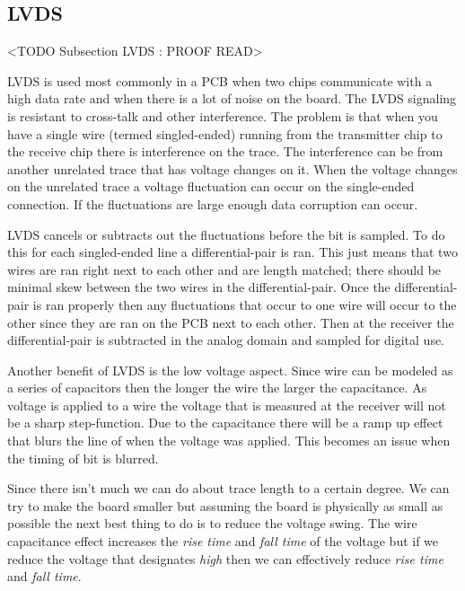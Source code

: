 	
\subsection{LVDS}  
	<TODO Subsection LVDS : PROOF READ>	
	
\ac{LVDS} is used most commonly in a \ac{PCB} when two chips communicate with a high data rate and when there is a lot of noise on the board. The \ac{LVDS} signaling is resistant to cross-talk and other interference. The problem is that when you have a single wire (termed singled-ended) running from the transmitter chip to the receive chip there is interference on the trace. The interference can be from another unrelated trace that has voltage changes on it. When the voltage changes on the unrelated trace a voltage fluctuation can occur on the single-ended connection. If the fluctuations are large enough data corruption can occur.

\ac{LVDS} cancels or subtracts out the fluctuations before the bit is sampled. To do this for each singled-ended line a differential-pair is ran. This just means that two wires are ran right next to each other and are length matched; there should be minimal skew between the two wires in the differential-pair. Once the differential-pair is ran properly then any fluctuations that occur to one wire will occur to the other since they are ran on the \ac{PCB} next to each other. Then at the receiver the differential-pair is subtracted in the analog domain and sampled for digital use.

Another benefit of \ac{LVDS} is the low voltage aspect. Since wire can be modeled as a series of capacitors then the longer the wire the larger the capacitance. As voltage is applied to a wire the voltage that is measured at the receiver will not be a sharp step-function. Due to the capacitance there will be a ramp up effect that blurs the line of when the voltage was applied. This becomes an issue when the timing of bit is blurred.

Since there isn't much we can do about trace length to a certain degree. We can try to make the board smaller but assuming the board is physically as small as possible the next best thing to do is to reduce the voltage swing. The wire capacitance effect increases the \emph{rise time} and \emph{fall time} of the voltage but if we reduce the voltage that designates \emph{high} then we can effectively reduce \emph{rise time} and \emph{fall time}.	
	
